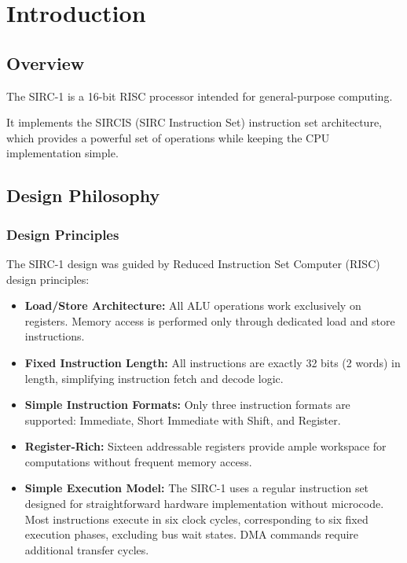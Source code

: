 \chapter{Introduction}
\label{ch:introduction}

\section{Overview}

The SIRC-1 is a 16-bit RISC processor intended for general-purpose computing.

\noindent It implements the SIRCIS (SIRC Instruction Set) instruction set architecture, which provides a powerful set of operations while keeping the CPU implementation simple.

\section{Design Philosophy}

\subsection{Design Principles}

The SIRC-1 design was guided by Reduced Instruction Set Computer (RISC) design principles:

\begin{itemize}
	\item \textbf{Load/Store Architecture:} All ALU operations work exclusively on registers. Memory access is performed only through dedicated load and store instructions.

	\item \textbf{Fixed Instruction Length:} All instructions are exactly 32 bits (2 words) in length, simplifying instruction fetch and decode logic.

	\item \textbf{Simple Instruction Formats:} Only three instruction formats are supported: Immediate, Short Immediate with Shift, and Register.

	\item \textbf{Register-Rich:} Sixteen addressable registers provide ample workspace for computations without frequent memory access.

	\item \textbf{Simple Execution Model:} The SIRC-1 uses a regular instruction set designed for straightforward hardware implementation without microcode. Most instructions execute in six clock cycles, corresponding to six fixed execution phases, excluding bus wait states. DMA commands require additional transfer cycles.
\end{itemize}

